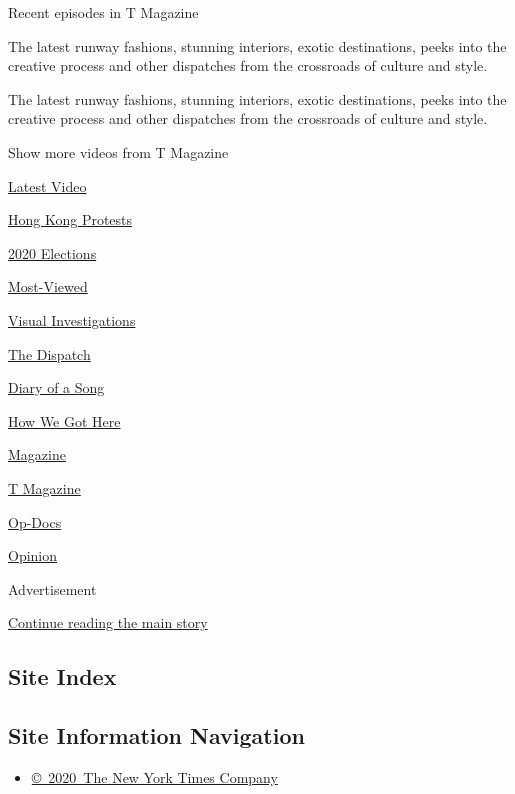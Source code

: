 Recent episodes in T Magazine

The latest runway fashions, stunning interiors, exotic destinations,
peeks into the creative process and other dispatches from the crossroads
of culture and style.

The latest runway fashions, stunning interiors, exotic destinations,
peeks into the creative process and other dispatches from the crossroads
of culture and style.

Show more videos from T Magazine

\href{/video}{}

\href{/video/latest-video}{Latest Video}

\href{/video/hk-protest}{Hong Kong Protests}

\href{/video/2020-Elections}{2020 Elections}

\href{/video/Most-Viewed}{Most-Viewed}

\href{/video/investigations}{Visual Investigations}

\href{/video/on-the-ground}{The Dispatch}

\href{/video/diaryofasong}{Diary of a Song}

\href{/video/how-we-got-here}{How We Got Here}

\href{/video/magazine}{Magazine}

\href{/video/t-magazine}{T Magazine}

\href{/video/op-docs}{Op-Docs}

\href{/video/opinion}{Opinion}

Advertisement

\protect\hyperlink{after-bottom}{Continue reading the main story}

\hypertarget{site-index}{%
\subsection{Site Index}\label{site-index}}

\hypertarget{site-information-navigation}{%
\subsection{Site Information
Navigation}\label{site-information-navigation}}

\begin{itemize}
\tightlist
\item
  \href{https://help.nytimes.com/hc/en-us/articles/115014792127-Copyright-notice}{©~2020~The
  New York Times Company}
\end{itemize}

